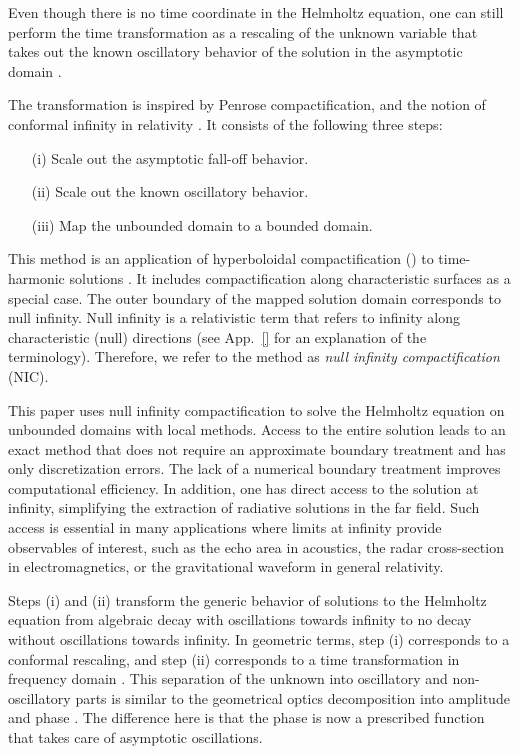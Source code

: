 \documentclass[draft,onefignum,onetabnum]{siamart190516}
\begin{document}
Even though there is no time coordinate in the Helmholtz equation, one can still perform the time transformation as a rescaling of the unknown variable that takes out the known oscillatory behavior of the solution in the asymptotic domain \cite{ZengFramework}.

The transformation is inspired by Penrose compactification, and the notion of conformal infinity in relativity \cite{Penrose, Penrose65, Frauendiener2004, Winicour2012}. It consists of the following three steps:
\begin{itemize}
	\item[(i)] Scale out the asymptotic fall-off behavior.
	\item[(ii)] Scale out the known oscillatory behavior.
	\item[(iii)] Map the unbounded domain to a bounded domain.
\end{itemize}
This method is an application of hyperboloidal compactification (\cite{Zenginoglu08, ZENGINOGLU20112286, Macedo_2020}) to time-harmonic solutions \cite{ZengFramework, ansorg2016spectral, macedo2018hyperboloidal, bizon2020toy, jaramillo2021pseudospectrum, jaramillo2021gravitational, destounis2021pseudospectrum, gasperin2021physical}. It includes compactification along characteristic surfaces as a special case. The outer boundary of the mapped solution domain corresponds to null infinity. Null infinity is a relativistic term that refers to infinity along characteristic (null) directions (see App.~\ref{} for an explanation of the terminology). Therefore, we refer to the method as \emph{null infinity compactification} (NIC).

This paper uses null infinity compactification to solve the Helmholtz equation on unbounded domains with local methods. Access to the entire solution leads to an exact method that does not require an approximate boundary treatment and has only discretization errors. The lack of a numerical boundary treatment improves computational efficiency. In addition, one has direct access to the solution at infinity, simplifying the extraction of radiative solutions in the far field. Such access is essential in many applications where limits at infinity provide observables of interest, such as the echo area in acoustics, the radar cross-section in electromagnetics, or the gravitational waveform in general relativity.

Steps (i) and (ii) transform the generic behavior of solutions to the Helmholtz equation from algebraic decay with oscillations towards infinity to no decay without oscillations towards infinity. In geometric terms, step (i) corresponds to a conformal rescaling, and step (ii) corresponds to a time transformation in frequency domain \cite{ZengFramework}. This separation of the unknown into oscillatory and non-oscillatory parts is similar to the geometrical optics decomposition into amplitude and phase \cite{engquist2003computational}. The difference here is that the phase is now a prescribed function that takes care of asymptotic oscillations. 
\end{document}
